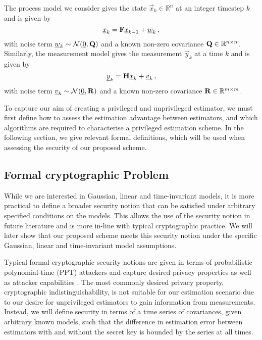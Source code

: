 \documentclass[letterpaper, 10 pt, conference]{IEEEtran}
\theoremstyle{definition}
\begin{document}
The process model we consider gives the state $\vec{x}_k\in\mathbb{R}^n$ at an integer timestep $k$ and is given by
\begin{equation}\label{eqn:linear_process_model}
   \vec{x}_k = \mat{F}\vec{x}_{k-1} + \vec{w}_k\,,
\end{equation}
with noise term ${\underline{w}}_k\sim \mathcal{N}({\underline{0}}, {{\mathbf{Q}}})$ and a known non-zero covariance ${{\mathbf{Q}}}\in \mathbb{R}^{n\times n}$. Similarly, the measurement model gives the measurement $\vec{y}_k$ at a time $k$ and is given by
\begin{equation}\label{eqn:linear_measurement_model}
   \vec{y}_k = \mat{H}\vec{x}_k + \vec{v}_k\,,
\end{equation}
with noise term ${\underline{v}}_k\sim \mathcal{N}({\underline{0}}, {{\mathbf{R}}})$ and a known non-zero covariance ${{\mathbf{R}}}\in \mathbb{R}^{m\times m}$.

To capture our aim of creating a privileged and unprivileged estimator, we must first define how to assess the estimation advantage between estimators, and which algorithms are required to characterise a privileged estimation scheme. In the following section, we give relevant formal definitions, which will be used when assessing the security of our proposed scheme.

% 
% 

\subsection{Formal cryptographic Problem}\label{subsec:crypto_problem}
While we are interested in Gaussian, linear and time-invariant models, it is more practical to define a broader security notion that can be satisfied under arbitrary specified conditions on the models. This allows the use of the security notion in future literature and is more in-line with typical cryptographic practice. We will later show that our proposed scheme meets this security notion under the specific Gaussian, linear and time-invariant model assumptions.

Typical formal cryptographic security notions are given in terms of probabilistic polynomial-time (PPT) attackers and capture desired privacy properties as well as attacker capabilities \cite{katzIntroductionModernCryptography2008}. The most commonly desired privacy property, cryptographic indistinguishability, is not suitable for our estimation scenario due to our desire for unprivileged estimators to gain  information from measurements. Instead, we will define security in terms of a time series of covariances, given arbitrary known models, such that the difference in estimation error between estimators with and without the secret key is bounded by the series at all times.
\end{document}
